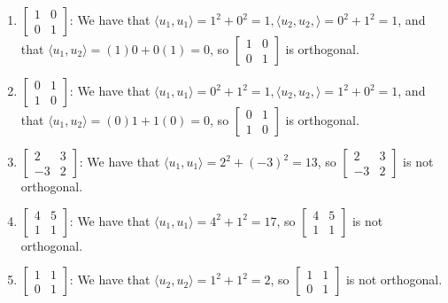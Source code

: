 \documentclass[12pt,letterpaper]{article}
\theoremstyle{definition}
\begin{document}
\begin{enumerate}
  \item $\begin{bmatrix} 1 & 0 \\ 0 & 1 \end{bmatrix}$: We have that $\langle u_1, u_1 \rangle = 1^2 + 0^2 = 1, \langle u_2, u_2, \rangle = 0^2 + 1^2 = 1$, and that $\langle u_1, u_2 \rangle = (1)0 + 0(1) = 0$, so $\begin{bmatrix} 1 & 0 \\ 0 & 1 \end{bmatrix}$ is orthogonal.
  \item $\begin{bmatrix} 0 & 1 \\ 1 & 0 \end{bmatrix}$: We have that $\langle u_1, u_1 \rangle = 0^2 + 1^2 = 1, \langle u_2, u_2, \rangle = 1^2 + 0^2 = 1$, and that $\langle u_1, u_2 \rangle = (0)1 + 1(0) = 0$, so $\begin{bmatrix} 0 & 1 \\ 1 & 0 \end{bmatrix}$ is orthogonal.
  \item $\begin{bmatrix} 2 & 3 \\ -3 & 2 \end{bmatrix}$: We have that $\langle u_1, u_1 \rangle = 2^2 + (-3)^2 = 13$, so $\begin{bmatrix} 2 & 3 \\ -3 & 2 \end{bmatrix}$ is not orthogonal.
  \item $\begin{bmatrix} 4 & 5 \\ 1 & 1 \end{bmatrix}$: We have that $\langle u_1, u_1 \rangle = 4^2 + 1^2 = 17$, so $\begin{bmatrix} 4 & 5 \\ 1 & 1 \end{bmatrix}$ is not orthogonal.
  \item $\begin{bmatrix} 1 & 1 \\ 0 & 1 \end{bmatrix}$: We have that $\langle u_2, u_2 \rangle = 1^2 + 1^2 = 2$, so $\begin{bmatrix} 1 & 1 \\ 0 & 1 \end{bmatrix}$ is not orthogonal.

\end{enumerate}
\end{document}

